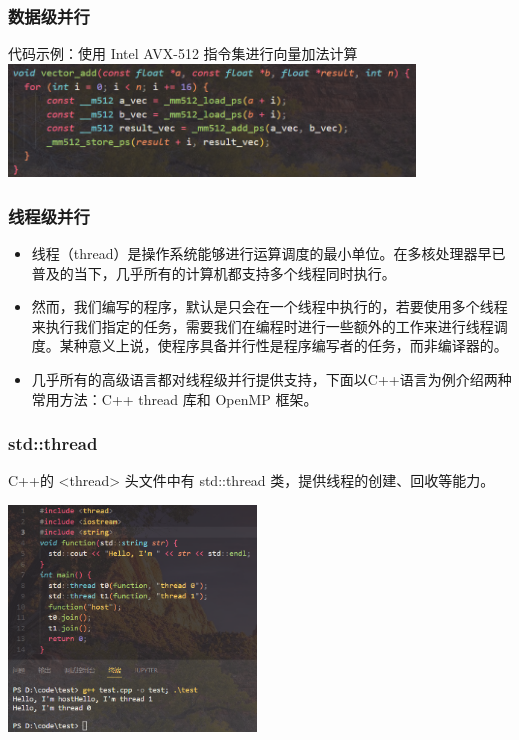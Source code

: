 \documentclass{beamer}
\begin{document}
\begin{frame}
\frametitle{数据级并行}

\begin{block}{代码示例：使用 Intel AVX-512 指令集进行向量加法计算}
\centering\includegraphics[height=3cm]{simd_code.png}
\end{block}
\end{frame}

\begin{frame}
\frametitle{线程级并行}
\begin{itemize}
    \item<1-> 线程（thread）是操作系统能够进行运算调度的最小单位。在多核处理器早已普及的当下，几乎所有的计算机都支持多个线程同时执行。
    \item<2-> 然而，我们编写的程序，默认是只会在一个线程中执行的，若要使用多个线程来执行我们指定的任务，需要我们在编程时进行一些额外的工作来进行线程调度。某种意义上说，使程序具备并行性是程序编写者的任务，而非编译器的。
    \item<3-> 几乎所有的高级语言都对线程级并行提供支持，下面以C++语言为例介绍两种常用方法：C++ thread 库和 OpenMP 框架。
\end{itemize}
\end{frame}

\begin{frame}
\frametitle{std::thread}
C++的 <thread> 头文件中有 std::thread 类，提供线程的创建、回收等能力。

\centering\includegraphics[height=6cm]{thread.png}
\end{frame}
\end{document}
